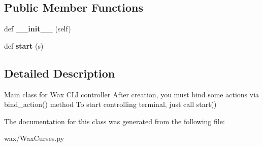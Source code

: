 \subsection*{Public Member Functions}
\begin{DoxyCompactItemize}
\item 
def {\bfseries \+\_\+\+\_\+init\+\_\+\+\_\+} (self)\hypertarget{classwax_1_1WaxCurses_1_1WaxCurses_a8b99fe79c8a55a1ca31a6a3fff6a03a0}{}\label{classwax_1_1WaxCurses_1_1WaxCurses_a8b99fe79c8a55a1ca31a6a3fff6a03a0}

\item 
def {\bfseries start} (s)\hypertarget{classwax_1_1WaxCurses_1_1WaxCurses_adfa97985ee52aa2f691a8672bb716016}{}\label{classwax_1_1WaxCurses_1_1WaxCurses_adfa97985ee52aa2f691a8672bb716016}

\end{DoxyCompactItemize}


\subsection{Detailed Description}
Main class for Wax C\+LI controller After creation, you must bind some actions via bind\+\_\+action() method To start controlling terminal, just call start() 

The documentation for this class was generated from the following file\+:\begin{DoxyCompactItemize}
\item 
wax/Wax\+Curses.\+py\end{DoxyCompactItemize}
